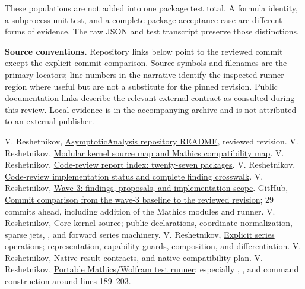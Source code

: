 \documentclass[11pt,letterpaper]{article}
\newcommand{\code}[1]{\texttt{\detokenize{#1}}}
\newcommand{\upstream}[2]{\href{https://github.com/VladimirReshetnikov/Asymptotic/blob/513917b5b387152256b14ac76d92dd30cd13a11d/#1}{#2}}
\begin{document}
These populations are not added into one package test total. A formula identity, a subprocess unit test, and a complete package acceptance case are different forms of evidence. The raw JSON and test transcript preserve those distinctions.

\clearpage
\begingroup\small\raggedright
\textbf{Source conventions.} Repository links below point to the reviewed commit except the explicit commit comparison. Source symbols and filenames are the primary locators; line numbers in the narrative identify the inspected runner region where useful but are not a substitute for the pinned revision. Public documentation links describe the relevant external contract as consulted during this review. Local evidence is in the accompanying archive and is not attributed to an external publisher.

\begin{thebibliography}{99}
 V. Reshetnikov, \upstream{README.md}{AsymptoticAnalysis repository README}, reviewed revision.
 V. Reshetnikov, \upstream{src/Kernel/README.md}{Modular kernel source map and Mathics compatibility map}.
 V. Reshetnikov, \upstream{external-reports/code-review/README.md}{Code-review report index: twenty-seven packages}.
 V. Reshetnikov, \upstream{docs/development/CODE_REVIEW_STATUS.md}{Code-review implementation status and complete finding crosswalk}.
 V. Reshetnikov, \upstream{docs/development/WAVE_3_INTAKE.md}{Wave 3: findings, proposals, and implementation scope}.
 GitHub, \href{https://github.com/VladimirReshetnikov/Asymptotic/compare/6687962f3c858a4f93623cfc496f33e35c6763d4...513917b5b387152256b14ac76d92dd30cd13a11d}{Commit comparison from the wave-3 baseline to the reviewed revision}; 29 commits ahead, including addition of the Mathics modules and runner.
 V. Reshetnikov, \upstream{src/Kernel/AsymptoticAnalysis.wl}{Core kernel source}; public declarations, coordinate normalization, sparse jets, \code{jetMerge}, and forward series machinery.
 V. Reshetnikov, \upstream{src/Kernel/SeriesOperations.wl}{Explicit series operations}; representation, capability guards, composition, and differentiation.
 V. Reshetnikov, \upstream{docs/development/NATIVE_RESULT_CONTRACTS.md}{Native result contracts}, and \upstream{docs/development/NATIVE_COMPATIBILITY.md}{native compatibility plan}.
 V. Reshetnikov, \upstream{validation/run_mathics_tests.py}{Portable Mathics/Wolfram test runner}; especially \code{run_case}, \code{main}, and command construction around lines 189--203.

\end{thebibliography}
\end{document}
